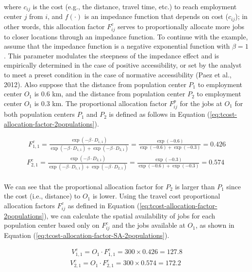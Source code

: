 \documentclass[]{elsarticle} %
\begin{document}
\noindent where \(c_{ij}\) is the cost (e.g., the distance, travel time,
etc.) to reach employment center \(j\) from \(i\), and \(f(\cdot)\) is
an impedance function that depends on cost (\(c_{ij}\)); in other words,
this allocation factor \(F^c_{ij}\) serves to proportionally allocate
more jobs to closer locations through an impedance function. To continue
with the example, assume that the impedance function is a negative
exponential function with \(\beta=1\). This parameter modulates the
steepness of the impedance effect and is empirically determined in the
case of positive accessibility, or set by the analyst to meet a preset
condition in the case of normative accessibility (Paez et al., 2012).
Also suppose that the distance from population center \(P_1\) to
employment center \(O_1\) is 0.6 km, and the distance from population
center \(P_2\) to employment center \(O_1\) is 0.3 km. The proportional
allocation factor \(F^p_{ij}\) for the jobs at \(O_1\) for both
population centers \(P_1\) and \(P_2\) is defined as follows in Equation
(\ref{eq:tcost-allocation-factor-2populations}).

\begin{equation}
\label{eq:tcost-allocation-factor-2populations}
\begin{array}{l}\
F^c_{1,1} = \frac{\exp(-\beta \cdot D_{1,1})}{\exp(-\beta \cdot D_{1,1}) + \exp(-\beta \cdot D_{2,1})} = \frac{\exp(-0.6)}{\exp(-0.6) + \exp(-0.3)} = 0.426\\
F^c_{2,1} = \frac{\exp(-\beta \cdot D_{2,1})}{\exp(-\beta \cdot D_{1,1}) + \exp(-\beta \cdot D_{2,1})}  = \frac{\exp(-0.3)}{\exp(-0.6) + \exp(-0.3)} = 0.574\\
\end{array}
\end{equation}

We can see that the proportional allocation factor for \(P_2\) is larger
than \(P_1\) since the cost (i.e., distance) to \(O_1\) is lower. Using
the travel cost proportional allocation factors \(F^c_{ij}\) as defined
in Equation (\ref{eq:tcost-allocation-factor-2populations}), we can
calculate the spatial availability of jobs for each population center
based only on \(F^c_{ij}\) and the jobs available at \(O_1\), as shown
in Equation (\ref{eq:tcost-allocation-factor-SA-2populations}).

\begin{equation}
\label{eq:tcost-allocation-factor-SA-2populations}
\begin{array}{l}\
V^c_{1,1} = O_1 \cdot F^c_{1,1} = 300 \times 0.426 = 127.8\\
V^c_{2,1} = O_1 \cdot F^c_{2,1} = 300 \times  0.574 = 172.2\\
\end{array}
\end{equation}
\end{document}
